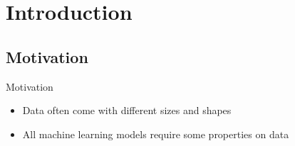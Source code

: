 \section{Introduction}

\subsection{Motivation}

\begin{frame}{Motivation}
    \begin{itemize}
        \item Data often come with different sizes and shapes
        \item All machine learning models require some properties on data
    \end{itemize}
\end{frame}

